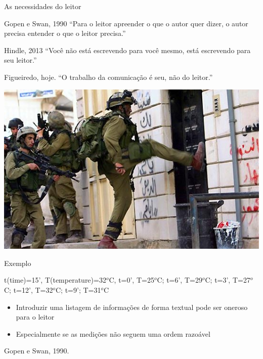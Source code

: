 \documentclass{beamer}
\begin{document}
\begin{frame}{As necessidades do leitor}
  \begin{block}{Gopen e Swan, 1990}
    ``Para o leitor apreender o que o autor quer dizer, o autor
    precisa entender o que o leitor precisa.''
  \end{block}
  \begin{block}{Hindle, 2013}
    ``Você não está escrevendo para você mesmo, está escrevendo para
    seu leitor.''
  \end{block}
  \begin{block}{Figueiredo, hoje.}
    ``O \alert{trabalho} da comunicação é seu, não do leitor.''
  \end{block}
\end{frame}

\begin{frame}
  \includegraphics[width=\textwidth]{Escrita/penaporta}
\end{frame}
\begin{frame}{Exemplo}
  \begin{example}
    t(time)=15', T(temperature)=32$^o$C, t=0', T=25$^o$C; t=6',
    T=29$^o$C; t=3', T=27$^o$C; t=12', T=32$^o$C; t=9'; T=31$^o$C
  \end{example}

  \begin{itemize}
  \item Introduzir uma listagem de informações de forma textual pode
    ser oneroso para o leitor
  \item Especialmente se as medições não seguem uma ordem razoável
  \end{itemize}
\vfill
Gopen e Swan, 1990.
\end{frame}
\end{document}
